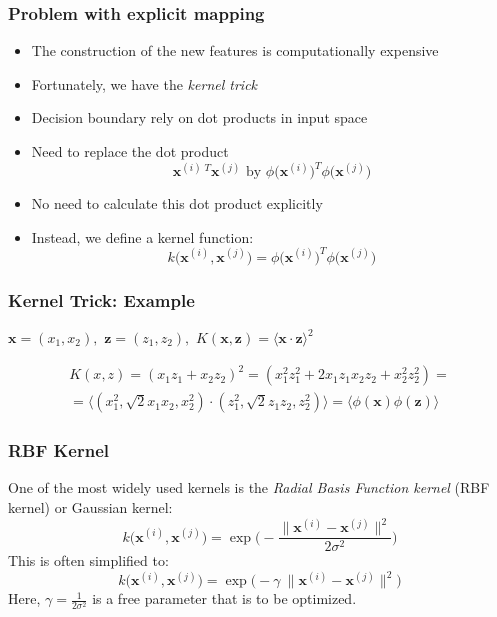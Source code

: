 \documentclass{beamer}
\begin{document}
\begin{frame}
  \frametitle{Problem with explicit mapping}
  \begin{itemize}
  \item The construction of the new features is computationally expensive
  \item Fortunately, we have the \textit{kernel trick}
  \item Decision boundary rely on dot products in input space
  \item Need to replace the dot product
    \[
    \mathbf{x}^{(i) \; T} \mathbf{x}^{(j)} \text{ by } \phi \big( \mathbf{x}^{(i)} \big)^T \phi \big( \mathbf{x}^{(j)} \big)
    \]
  \item No need to calculate this dot product explicitly
  \item Instead, we define a kernel function:
    \[
    k \big( \mathbf{x}^{(i)}, \mathbf{x}^{(j)}  \big) = \phi \big( \mathbf{x}^{(i)} \big)^T \phi \big( \mathbf{x}^{(j)} \big)
    \]
  \end{itemize}
\end{frame}

\begin{frame}
  \frametitle{Kernel Trick: Example}
  $\mathbf{x} = (x_1, x_2), $
  $\mathbf{z} = (z_1, z_2), $
  $K(\mathbf{x}, \mathbf{z}) = \langle \mathbf{x} \cdot \mathbf{z} \rangle^2$

  \begin{multline*}
  K(x, z) = (x_1z_1 + x_2z_2)^2 = (x_1^2z_1^2 + 2x_1z_1x_2z_2 + x_2^2z_2^2) = \\
  = \langle (x_1^2, \sqrt{2}x_1x_2, x_2^2) \cdot (z_1^2, \sqrt{2}z_1z_2, z_2^2) \rangle
  = \langle \phi(\mathbf{x}) \phi(\mathbf{z}) \rangle
  \end{multline*}

\end{frame}

\begin{frame}
  \frametitle{RBF Kernel}
  One of the most widely used kernels is the \textit{Radial Basis Function kernel} (RBF kernel) or Gaussian kernel:
  \[
  k \big( \mathbf{x}^{(i)}, \mathbf{x}^{(j)}  \big) = \exp \Bigg( - \frac{ \lVert \mathbf{x}^{(i)} - \mathbf{x}^{(j)} \rVert^2  }{2 \sigma^2} \Bigg)
  \]
  This is often simplified to:
  \[
  k \big( \mathbf{x}^{(i)}, \mathbf{x}^{(j)}  \big) = \exp \bigg(  -\gamma\ \lVert \mathbf{x}^{(i)} - \mathbf{x}^{(j)} \rVert^2  \bigg)
  \]
  Here, $\gamma = \frac{1}{2 \sigma^2}$ is a free parameter that is to be optimized.
\end{frame}
\end{document}
